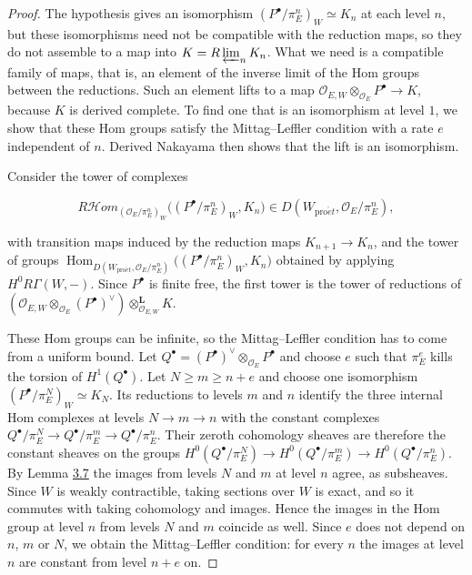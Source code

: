 \documentclass[11pt]{article}
\providecommand{\Hom}{}\renewcommand{\Hom}{\operatorname{Hom}}
\providecommand{\cHom}{}\renewcommand{\cHom}{R\mathcal{H}\!om}
\begin{document}
\begin{proof}[{Proof}]\label{bp222}%
The hypothesis gives an isomorphism \((P^\bullet/\pi_E^n)_W\simeq K_n\) at each level \(n\), but these isomorphisms need not be compatible with the reduction maps, so they do not assemble to a map into \(K=R\varprojlim_nK_n\). What we need is a compatible family of maps, that is, an element of the inverse limit of the Hom groups between the reductions. Such an element lifts to a map \(\mathcal O_{E,W}\otimes_{\mathcal O_E}P^\bullet\to K\), because \(K\) is derived complete. To find one that is an isomorphism at level \(1\), we show that these Hom groups satisfy the Mittag–Leffler condition with a rate \(e\) independent of \(n\). Derived Nakayama then shows that the lift is an isomorphism.

Consider the tower of complexes

\[
\cHom_{(\mathcal O_E/\pi_E^n)_W}\bigl((P^\bullet/\pi_E^n)_W,K_n\bigr)
\in D(W_{\mathrm{pro}\acute{e}t},\mathcal O_E/\pi_E^n),
\]

with transition maps induced by the reduction maps \(K_{n+1}\to K_n\), and the tower of groups \(\Hom_{D(W_{\mathrm{pro}\acute{e}t},\mathcal O_E/\pi_E^n)}\bigl((P^\bullet/\pi_E^n)_W,K_n\bigr)\) obtained by applying \(H^0R\Gamma(W,-)\). Since \(P^\bullet\) is finite free, the first tower is the tower of reductions of \((\mathcal O_{E,W}\otimes_{\mathcal O_E}(P^\bullet)^\vee)\otimes^{\mathbf L}_{\mathcal O_{E,W}}K\).

These Hom groups can be infinite, so the Mittag–Leffler condition has to come from a uniform bound. Let \(Q^\bullet=(P^\bullet)^\vee\otimes_{\mathcal O_E}P^\bullet\) and choose \(e\) such that \(\pi_E^e\) kills the torsion of \(H^1(Q^\bullet)\). Let \(N\ge m\ge n+e\) and choose one isomorphism \((P^\bullet/\pi_E^N)_W\simeq K_N\). Its reductions to levels \(m\) and \(n\) identify the three internal Hom complexes at levels \(N\to m\to n\) with the constant complexes \(Q^\bullet/\pi_E^N\to Q^\bullet/\pi_E^m\to Q^\bullet/\pi_E^n\). Their zeroth cohomology sheaves are therefore the constant sheaves on the groups \(H^0(Q^\bullet/\pi_E^N)\to H^0(Q^\bullet/\pi_E^m)\to H^0(Q^\bullet/\pi_E^n)\). By Lemma \hyperref[bp214]{3.7} the images from levels \(N\) and \(m\) at level \(n\) agree, as subsheaves. Since \(W\) is weakly contractible, taking sections over \(W\) is exact, and so it commutes with taking cohomology and images. Hence the images in the Hom group at level \(n\) from levels \(N\) and \(m\) coincide as well. Since \(e\) does not depend on \(n\), \(m\) or \(N\), we obtain the Mittag–Leffler condition: for every \(n\) the images at level \(n\) are constant from level \(n+e\) on.


\end{proof}
\end{document}

